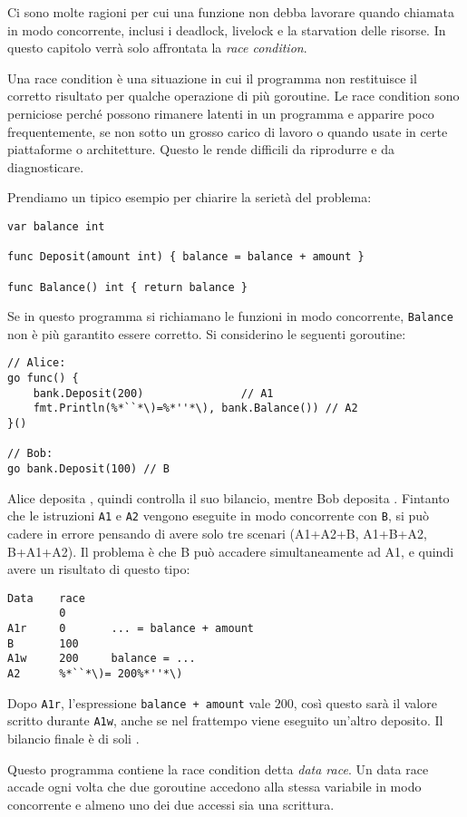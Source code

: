 Ci sono molte ragioni per cui una funzione non debba lavorare quando chiamata in modo concorrente, inclusi i deadlock, livelock e la starvation delle risorse.
In questo capitolo verrà solo affrontata la \textit{race condition}.

Una race condition è una situazione in cui il programma non restituisce il corretto risultato per qualche operazione di più goroutine.
Le race condition sono perniciose perché possono rimanere latenti in un programma e apparire poco frequentemente, se non sotto un grosso carico di lavoro o quando usate in certe piattaforme o architetture.
Questo le rende difficili da riprodurre e da diagnosticare.

Prendiamo un tipico esempio per chiarire la serietà del problema:
\begin{lstlisting}[frame=single, label={lst:lstlisting9-1.1}]
var balance int

func Deposit(amount int) { balance = balance + amount }

func Balance() int { return balance }
\end{lstlisting}
Se in questo programma si richiamano le funzioni in modo concorrente, \verb|Balance| non è più garantito essere corretto.
Si considerino le seguenti goroutine:
\begin{lstlisting}[frame=single, label={lst:lstlisting9-1.2}]
// Alice:
go func() {
    bank.Deposit(200)               // A1
    fmt.Println(%*``*\)=%*''*\), bank.Balance()) // A2
}()

// Bob:
go bank.Deposit(100) // B
\end{lstlisting}
Alice deposita , quindi controlla il suo bilancio, mentre Bob deposita .
Fintanto che le istruzioni \verb|A1| e \verb|A2| vengono eseguite in modo concorrente con \verb|B|, si può cadere in errore pensando di avere solo tre scenari (A1+A2+B, A1+B+A2, B+A1+A2).
Il problema è che B può accadere simultaneamente ad A1, e quindi avere un risultato di questo tipo:
\begin{lstlisting}[label={lst:lstlisting9-1.3}]
Data	race
        0
A1r     0       ... = balance + amount
B       100
A1w     200     balance = ...
A2      %*``*\)= 200%*''*\)
\end{lstlisting}
Dopo \verb|A1r|, l'espressione \verb|balance + amount| vale $200$, così questo sarà il valore scritto durante \verb|A1w|, anche se nel frattempo viene eseguito un'altro deposito.
Il bilancio finale è di soli .

Questo programma contiene la race condition detta \textit{data race}.
Un data race accade ogni volta che due goroutine accedono alla stessa variabile in modo concorrente e almeno uno dei due accessi sia una scrittura.

